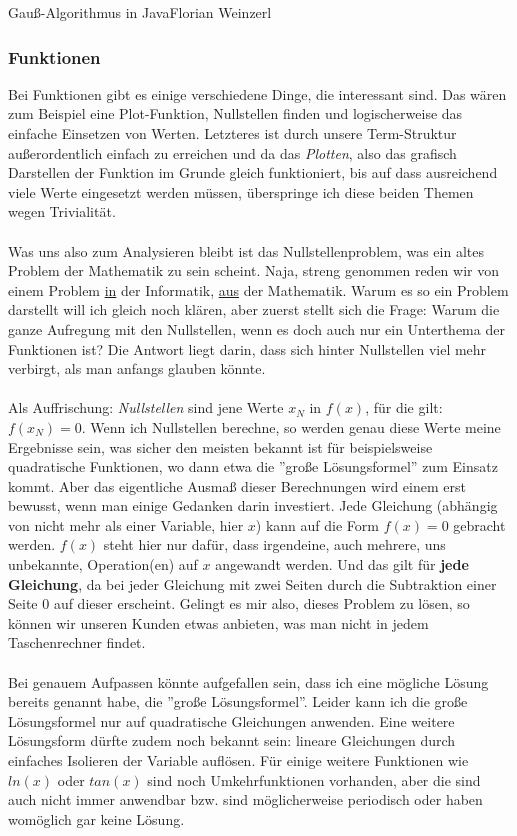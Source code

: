 			{Gauß-Algorithmus in Java}{Florian Weinzerl}


\subsubsection{Funktionen}
Bei Funktionen gibt es einige verschiedene Dinge, die interessant sind. Das wären zum Beispiel eine Plot-Funktion, Nullstellen finden und logischerweise das einfache Einsetzen von Werten. Letzteres ist durch unsere Term-Struktur außerordentlich einfach zu erreichen und da das \textit{Plotten}, also das grafisch Darstellen der Funktion im Grunde gleich funktioniert, bis auf dass ausreichend viele Werte eingesetzt werden müssen, überspringe ich diese beiden Themen wegen Trivialität.\\
\\
Was uns also zum Analysieren bleibt ist das Nullstellenproblem, was ein altes Problem der Mathematik zu sein scheint. Naja, streng genommen reden wir von einem Problem \underline{in} der Informatik, \underline{aus} der Mathematik. Warum es so ein Problem darstellt will ich gleich noch klären, aber zuerst stellt sich die Frage: Warum die ganze Aufregung mit den Nullstellen, wenn es doch auch nur ein Unterthema der Funktionen ist? Die Antwort liegt darin, dass sich hinter Nullstellen viel mehr verbirgt, als man anfangs glauben könnte.\\
\\
Als Auffrischung: \textit{Nullstellen} sind jene Werte $x_{N}$ in $f(x)$, für die gilt: $f(x_{N})=0$. Wenn ich Nullstellen berechne, so werden genau diese Werte meine Ergebnisse sein, was sicher den meisten bekannt ist für beispielsweise quadratische Funktionen, wo dann etwa die ''große Lösungsformel'' zum Einsatz kommt. Aber das eigentliche Ausmaß dieser Berechnungen wird einem erst bewusst, wenn man einige Gedanken darin investiert. Jede Gleichung (abhängig von nicht mehr als einer Variable, hier $x$) kann auf die Form $f(x)=0$ gebracht werden. $f(x)$ steht hier nur dafür, dass irgendeine, auch mehrere, uns unbekannte, Operation(en) auf $x$ angewandt werden. Und das gilt für \textbf{jede Gleichung}, da bei jeder Gleichung mit zwei Seiten durch die Subtraktion einer Seite $0$ auf dieser erscheint. Gelingt es mir also, dieses Problem zu lösen, so können wir unseren Kunden etwas anbieten, was man nicht in jedem Taschenrechner findet.\\
\\
Bei genauem Aufpassen könnte aufgefallen sein, dass ich eine mögliche Lösung bereits genannt habe, die ''große Lösungsformel''. Leider kann ich die große Lösungsformel nur auf quadratische Gleichungen anwenden. Eine weitere Lösungsform dürfte zudem noch bekannt sein: lineare Gleichungen durch einfaches Isolieren der Variable auflösen. Für einige weitere Funktionen wie $ln(x)$ oder $tan(x)$ sind noch Umkehrfunktionen vorhanden, aber die sind auch nicht immer anwendbar bzw. sind möglicherweise periodisch oder haben womöglich gar keine Lösung.\\
